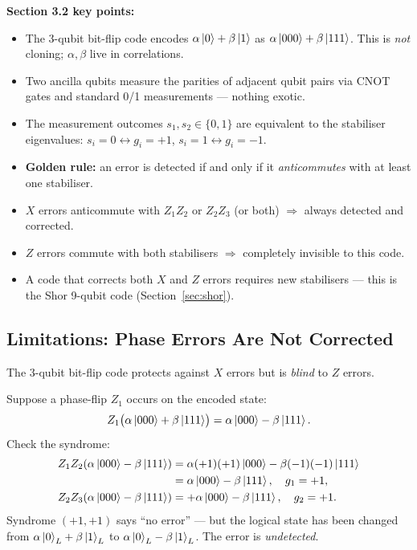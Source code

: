 \documentclass[11pt, a4paper]{article}
\theoremstyle{definition}
\theoremstyle{plain}
\theoremstyle{remark}
\begin{document}
\begin{summarybox}
\textbf{Section 3.2 key points:}
\begin{itemize}
  \item The 3-qubit bit-flip code encodes
        $\alpha\ket{0}+\beta\ket{1}$ as $\alpha\ket{000}+\beta\ket{111}$.
        This is \emph{not} cloning; $\alpha,\beta$ live in correlations.
  \item Two ancilla qubits measure the parities of adjacent qubit pairs
        via CNOT gates and standard 0/1 measurements --- nothing exotic.
  \item The measurement outcomes $s_1, s_2 \in \{0,1\}$ are equivalent
        to the stabiliser eigenvalues:
        $s_i=0 \leftrightarrow g_i=+1$,\; $s_i=1 \leftrightarrow g_i=-1$.
  \item \textbf{Golden rule:} an error is detected if and only if it
        \emph{anticommutes} with at least one stabiliser.
  \item $X$ errors anticommute with $Z_1Z_2$ or $Z_2Z_3$ (or both)
        $\Rightarrow$ always detected and corrected.
  \item $Z$ errors commute with both stabilisers $\Rightarrow$ completely
        invisible to this code.
  \item A code that corrects both $X$ and $Z$ errors requires new
        stabilisers --- this is the Shor 9-qubit code
        (Section~\ref{sec:shor}).
\end{itemize}
\end{summarybox}

\subsection{Limitations: Phase Errors Are Not Corrected}

The 3-qubit bit-flip code protects against $X$ errors but is \emph{blind} to
$Z$ errors.

\begin{workedexample}
Suppose a phase-flip $Z_1$ occurs on the encoded state:
\[
  Z_1\bigl(\alpha\ket{000}+\beta\ket{111}\bigr)
  = \alpha\ket{000} - \beta\ket{111}.
\]
Check the syndrome:
\begin{align*}
  Z_1 Z_2 (\alpha\ket{000}-\beta\ket{111})
  &= \alpha(+1)(+1)\ket{000} - \beta(-1)(-1)\ket{111}\\
  &= \alpha\ket{000}-\beta\ket{111},\quad g_1 = +1,\\
  Z_2 Z_3 (\alpha\ket{000}-\beta\ket{111})
  &= +\alpha\ket{000} - \beta\ket{111},\quad g_2 = +1.
\end{align*}
Syndrome $(+1,+1)$ says ``no error'' --- but the logical state has been
changed from $\alpha\ket{0}_L+\beta\ket{1}_L$ to
$\alpha\ket{0}_L - \beta\ket{1}_L$.  The error is \emph{undetected}.
\end{workedexample}
\end{document}
